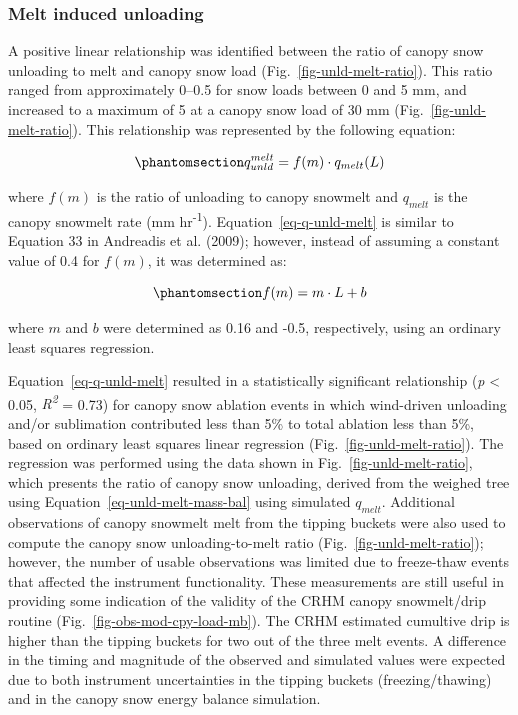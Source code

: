 \documentclass[
  letterpaper,
  DIV=11,
  numbers=noendperiod]{scrartcl}
\begin{document}
\subsubsection{Melt induced unloading}\label{melt-induced-unloading}

A positive linear relationship was identified between the ratio of
canopy snow unloading to melt and canopy snow load
(Fig.~\ref{fig-unld-melt-ratio}). This ratio ranged from approximately
0--0.5 for snow loads between 0 and 5 mm, and increased to a maximum of
5 at a canopy snow load of 30 mm (Fig.~\ref{fig-unld-melt-ratio}). This
relationship was represented by the following equation:

\begin{equation}\phantomsection\label{eq-q-unld-melt}{
q_{unld}^{melt} = f(m) \cdot q_{melt}(L)
}\end{equation}

where \(f(m)\) is the ratio of unloading to canopy snowmelt and
\(q_{melt}\) is the canopy snowmelt rate (mm hr\textsuperscript{-1}).
Equation~\ref{eq-q-unld-melt} is similar to Equation 33 in Andreadis et
al. (2009); however, instead of assuming a constant value of 0.4 for
\(f(m)\), it was determined as:

\begin{equation}\phantomsection\label{eq-fm}{
f(m) = m \cdot L + b
}\end{equation}

where \(m\) and \(b\) were determined as 0.16 and -0.5, respectively,
using an ordinary least squares regression.

Equation~\ref{eq-q-unld-melt} resulted in a statistically significant
relationship (\emph{p} \textless{} 0.05, \emph{R\textsuperscript{2}} =
0.73) for canopy snow ablation events in which wind-driven unloading
and/or sublimation contributed less than 5\% to total ablation less than
5\%, based on ordinary least squares linear regression
(Fig.~\ref{fig-unld-melt-ratio}). The regression was performed using the
data shown in Fig.~\ref{fig-unld-melt-ratio}, which presents the ratio
of canopy snow unloading, derived from the weighed tree using
Equation~\ref{eq-unld-melt-mass-bal} using simulated \(q_{melt}\).
Additional observations of canopy snowmelt melt from the tipping buckets
were also used to compute the canopy snow unloading-to-melt ratio
(Fig.~\ref{fig-unld-melt-ratio}); however, the number of usable
observations was limited due to freeze-thaw events that affected the
instrument functionality. These measurements are still useful in
providing some indication of the validity of the CRHM canopy
snowmelt/drip routine (Fig.~\ref{fig-obs-mod-cpy-load-mb}). The CRHM
estimated cumultive drip is higher than the tipping buckets for two out
of the three melt events. A difference in the timing and magnitude of
the observed and simulated values were expected due to both instrument
uncertainties in the tipping buckets (freezing/thawing) and in the
canopy snow energy balance simulation.
\end{document}
